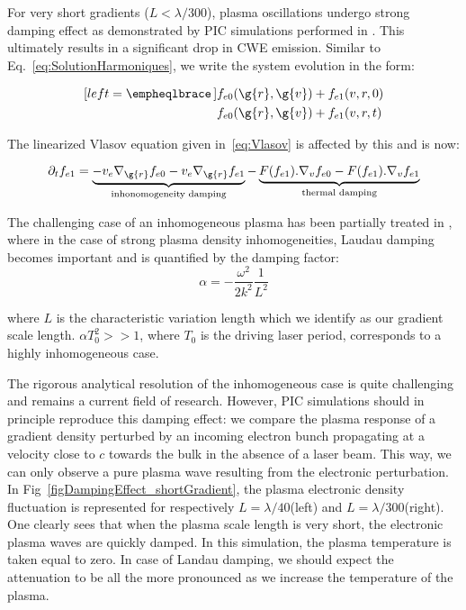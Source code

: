 For very short gradients ($L < \lambda/300$), plasma oscillations undergo strong damping effect as demonstrated by PIC simulations performed in \cite{thaury2010high}. This ultimately results in a significant drop in CWE emission.
Similar to Eq.~\ref{eq:SolutionHarmoniques}, we write the system evolution in the form:

\begin{subequations}
\label{eq:SolutionHarmoniquesNH}
\begin{align}[left = \empheqlbrace\,]
&f_{e0}(\g{r},\g{v}) + f_{e1}(v,r,0)\label{eq:SolutionHarmoniquesNH1}\\
&f_{e0}(\g{r},\g{v}) + f_{e1}(v,r,t)\label{eq:SolutionHarmoniquesNH2}
\end{align}
\end{subequations}

\noindent The linearized Vlasov equation given in~\ref{eq:Vlasov} is affected by this and is now:

\begin{equation}
\label{eq:VlasovNH}
\partial_{t} f_{e1} = \underbrace{-v_e \nabla_{\g{r}} f_{e0} - v_e \nabla_{\g{r}} f_{e1}}_{\text{inhonomogeneity damping}} -  \underbrace{F(f_{e1}).\nabla_{v}f_{e0} - F(f_{e1}).\nabla_{v}f_{e1}}_{\text{thermal damping}}
\end{equation}


\noindent The challenging case of an inhomogeneous plasma has been partially treated in \cite{karpman1974nonlinear,asseo1972effect}, where in the case of strong plasma density inhomogeneities, Laudau damping becomes
important and is quantified by the damping factor:
$$
\alpha = -\frac{\omega^2}{2k^2}\frac{1}{L^2}
$$

\noindent where $L$ is the characteristic variation length which we identify as our gradient scale length. $\alpha T_0^2 >> 1$, where $T_0$ is the driving laser period, corresponds to a highly inhomogeneous case.

\noindent The rigorous analytical resolution of the inhomogeneous case is quite challenging and remains a current field of research. However, PIC simulations should in principle reproduce this damping effect: we compare the plasma response of a gradient density perturbed by an incoming electron bunch propagating at a velocity close to $c$ towards the bulk in the absence of a laser beam. This way, we can only observe a pure plasma wave resulting from the electronic perturbation. In Fig~\ref{figDampingEffect_shortGradient}, the plasma
electronic density fluctuation is represented for respectively $L=\lambda/40$(left) and $L=\lambda/300$(right).
One clearly sees that when the plasma scale length is very short, the electronic plasma waves are quickly damped. In this simulation, the plasma temperature is taken equal to zero. In case of Landau damping, we should 
expect the attenuation to be all the more pronounced as we increase the temperature of the plasma. 


